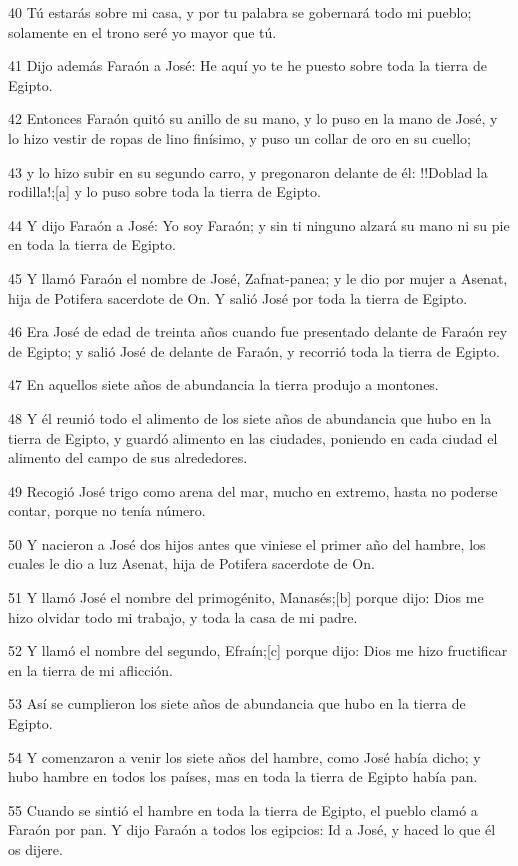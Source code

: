 40 Tú estarás sobre mi casa, y por tu palabra se gobernará todo mi pueblo; solamente en el trono seré yo mayor que tú.

41 Dijo además Faraón a José: He aquí yo te he puesto sobre toda la tierra de Egipto.

42 Entonces Faraón quitó su anillo de su mano, y lo puso en la mano de José, y lo hizo vestir de ropas de lino finísimo, y puso un collar de oro en su cuello;

43 y lo hizo subir en su segundo carro, y pregonaron delante de él: !!Doblad la rodilla!;[a] y lo puso sobre toda la tierra de Egipto.

44 Y dijo Faraón a José: Yo soy Faraón; y sin ti ninguno alzará su mano ni su pie en toda la tierra de Egipto.

45 Y llamó Faraón el nombre de José, Zafnat-panea; y le dio por mujer a Asenat, hija de Potifera sacerdote de On. Y salió José por toda la tierra de Egipto.

46 Era José de edad de treinta años cuando fue presentado delante de Faraón rey de Egipto; y salió José de delante de Faraón, y recorrió toda la tierra de Egipto.

47 En aquellos siete años de abundancia la tierra produjo a montones.

48 Y él reunió todo el alimento de los siete años de abundancia que hubo en la tierra de Egipto, y guardó alimento en las ciudades, poniendo en cada ciudad el alimento del campo de sus alrededores.

49 Recogió José trigo como arena del mar, mucho en extremo, hasta no poderse contar, porque no tenía número.

50 Y nacieron a José dos hijos antes que viniese el primer año del hambre, los cuales le dio a luz Asenat, hija de Potifera sacerdote de On.

51 Y llamó José el nombre del primogénito, Manasés;[b] porque dijo: Dios me hizo olvidar todo mi trabajo, y toda la casa de mi padre.

52 Y llamó el nombre del segundo, Efraín;[c] porque dijo: Dios me hizo fructificar en la tierra de mi aflicción.

53 Así se cumplieron los siete años de abundancia que hubo en la tierra de Egipto.

54 Y comenzaron a venir los siete años del hambre, como José había dicho; y hubo hambre en todos los países, mas en toda la tierra de Egipto había pan.

55 Cuando se sintió el hambre en toda la tierra de Egipto, el pueblo clamó a Faraón por pan. Y dijo Faraón a todos los egipcios: Id a José, y haced lo que él os dijere.

